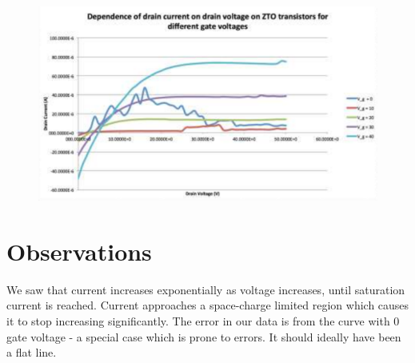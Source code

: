 \documentclass{article}
\begin{document}
\begin{figure}[h!]
\centering
\includegraphics[scale=0.8]{trans.png}
\end{figure}

\section{Observations}

We saw that current increases exponentially as voltage increases, until saturation current is reached. Current approaches a space-charge limited region which causes it to stop increasing significantly. The error in our data is from the curve with 0 gate voltage - a special case which is prone to errors. It should ideally have been a flat line.
\end{document}
